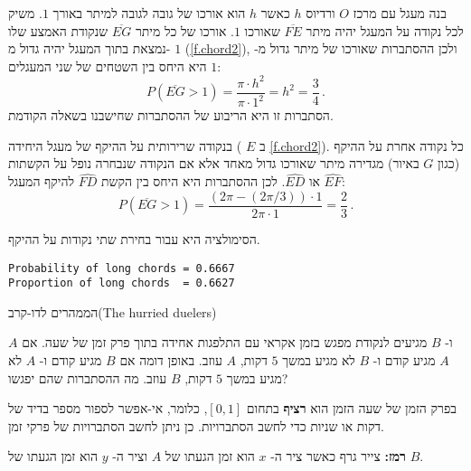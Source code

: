 \begin{figure}[tb]
{
}
\end{figure}

בנה מעגל עם מרכז
$O$
ורדיוס 
$h$
כאשר 
$h$
הוא אורכו של גובה לגובה למיתר באורך 
$1$.
משיק לכל נקודה על המעגל יהיה מיתר
$\overline{FE}$
שאורכו 
$1$.
אורכו של כל מיתר
$\overline{EG}$
שנקודת האמצע שלו נמצאת בתוך המעגל יהיה גדול מ-%
$1$
(\ref{f.chord2}),
ולכן ההסתברות שאורכו של מיתר גדול מ-%
$1$
היא היחס בין השטחים של שני המעגלים:
\[
P(\overline{EG}>1)=\frac{\pi \cdot h^2}{\pi \cdot 1^2}=h^2=\frac{3}{4}\,.
\]
הסתברות זו היא הריבוע של ההסתברות שחישבנו בשאלה הקודמת.

בנקודה שרירותית על ההיקף של מעגל היחידה (%
$E$
ב%
\ref{f.chord2}).
כל נקודה אחרת על ההיקף (כגון 
$G$
באיור) מגדירה מיתר שאורכו גדול מאחד אלא אם הנקודה שנבחרה נופל על הקשתות
$\widehat{EF}$
או
$\widehat{ED}$.
לכן ההסתברות היא היחס בין הקשת
$\widehat{FD}$
להיקף המעגל:
\[
P(\overline{EG}>1)=\frac{(2\pi-(2\pi/3))\cdot 1}{2\pi \cdot 1}=\frac{2}{3}\,.
\]

\newpage

\sml{}

הסימולציה היא עבור בחירת שתי נקודות על ההיקף.
\begin{verbatim}
Probability of long chords = 0.6667
Proportion of long chords  = 0.6627
\end{verbatim}


\begin{prob}{הממהרים לדו-קרב}{}{(The hurried duelers)}

$A$
ו-%
$B$
מגיעים לנקודת מפגש בזמן אקראי עם התלפגות אחידה בתוך פרק זמן של שעה. אם 
$A$
מגיע קודם ו-%
$B$
לא מגיע במשך 
$5$
דקות, 
$A$
עוזב. באופן דומה אם 
$B$
מגיע קודם ו-%
$A$
לא מגיע במשך 
$5$
דקות,
$B$
עוזב. מה ההסתברות שהם יפגשו?

בפרק הזמן של שעה הזמן הוא
\textbf{רציף}
בתחום
$[0,1]$,
כלומר, אי-אפשר לספור מספר בדיד של דקות או שניות כדי לחשב הסתברויות. כן ניתן לחשב הסתברויות של פרקי זמן.

\textbf{רמז:}
צייר גרף כאשר ציר ה-%
$x$
הוא זמן הגעתו של
$A$
וציר ה-%
$y$
הוא זמן הגעתו של 
$B$.
\end{prob}

